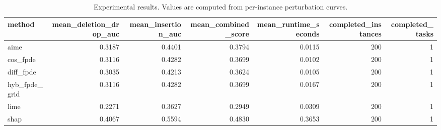 \begin{table}[t]
\caption{Experimental results. Values are computed from per-instance perturbation curves.}
\label{tab:main_results_computed}
\centering
\begin{tabular}{lrrrrrr}
\toprule
method & mean\_deletion\_drop\_auc & mean\_insertion\_auc & mean\_combined\_score & mean\_runtime\_seconds & completed\_instances & completed\_tasks \\
\midrule
aime & 0.3187 & 0.4401 & 0.3794 & 0.0115 & 200 & 1 \\
cos\_fpde & 0.3116 & 0.4282 & 0.3699 & 0.0102 & 200 & 1 \\
diff\_fpde & 0.3035 & 0.4213 & 0.3624 & 0.0105 & 200 & 1 \\
hyb\_fpde\_grid & 0.3116 & 0.4282 & 0.3699 & 0.0167 & 200 & 1 \\
lime & 0.2271 & 0.3627 & 0.2949 & 0.0309 & 200 & 1 \\
shap & 0.4067 & 0.5594 & 0.4830 & 0.3653 & 200 & 1 \\
\bottomrule
\end{tabular}

\end{table}
